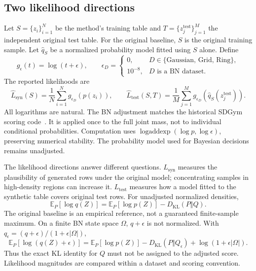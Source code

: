 \documentclass[11pt,letterpaper]{article}
\newcommand{\E}{\mathbb{E}}
\newcommand{\KL}{D_{\mathrm{KL}}}
\newcommand{\Lsyn}{L_{\mathrm{syn}}}
\newcommand{\Ltest}{L_{\mathrm{test}}}
\begin{document}
\subsection{Two likelihood directions}
Let $S=\{z_i\}_{i=1}^{N}$ be the method's training table and $T=\{z_j^{\mathrm{test}}\}_{j=1}^{M}$ the independent original test table. For the original baseline, $S$ is the original training sample. Let $\widehat q_S$ be a normalized probability model fitted using $S$ alone. Define
\begin{equation}
 g_\epsilon(t)=\log(t+\epsilon),\qquad
 \epsilon_D=\begin{cases}0,&D\in\{\text{Gaussian, Grid, Ring}\},\\10^{-8},&D\text{ is a BN dataset}.
 \end{cases}
\end{equation}
The reported likelihoods are
\begin{equation}
 \widehat\Lsyn(S)=\frac1N\sum_{i=1}^{N}g_{\epsilon_D}(p(z_i)),\qquad
 \widehat\Ltest(S,T)=\frac1M\sum_{j=1}^{M}g_{\epsilon_D}(\widehat q_S(z_j^{\mathrm{test}})).
 \label{eq:likelihoods}
\end{equation}
All logarithms are natural. The BN adjustment matches the historical SDGym scoring code~\cite{sdgymhistorical}. It is applied once to the full joint mass, not to individual conditional probabilities. Computation uses $\operatorname{logaddexp}(\log p,\log\epsilon)$, preserving numerical stability. The probability model used for Bayesian decisions remains unadjusted.

The likelihood directions answer different questions. $\Lsyn$ measures the plausibility of generated rows under the original model; concentrating samples in high-density regions can increase it. $\Ltest$ measures how a model fitted to the synthetic table covers original test rows. For unadjusted normalized densities,
\begin{equation}
 \E_P[\log q(Z)]=\E_P[\log p(Z)]-\KL(P\Vert Q).
 \label{eq:kl}
\end{equation}
The original baseline is an empirical reference, not a guaranteed finite-sample maximum. On a finite BN state space $\Omega$, $q+\epsilon$ is not normalized. With $q_\epsilon=(q+\epsilon)/(1+\epsilon|\Omega|)$,
\begin{equation}
 \E_P[\log(q(Z)+\epsilon)]
 =\E_P[\log p(Z)]-\KL(P\Vert Q_\epsilon)+\log(1+\epsilon|\Omega|).
\end{equation}
Thus the exact KL identity for $Q$ must not be assigned to the adjusted score. Likelihood magnitudes are compared within a dataset and scoring convention.
\end{document}
